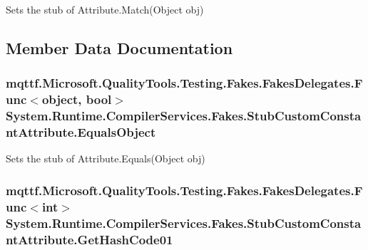 Sets the stub of Attribute.\-Match(\-Object obj)



\subsection{Member Data Documentation}
\hypertarget{class_system_1_1_runtime_1_1_compiler_services_1_1_fakes_1_1_stub_custom_constant_attribute_ad6fe622b0b81d2f93c0c7b753257330c}{
\subsubsection[{Equals\-Object}]{\setlength{\rightskip}{0pt plus 5cm}mqttf.\-Microsoft.\-Quality\-Tools.\-Testing.\-Fakes.\-Fakes\-Delegates.\-Func$<$object, bool$>$ System.\-Runtime.\-Compiler\-Services.\-Fakes.\-Stub\-Custom\-Constant\-Attribute.\-Equals\-Object}}\label{class_system_1_1_runtime_1_1_compiler_services_1_1_fakes_1_1_stub_custom_constant_attribute_ad6fe622b0b81d2f93c0c7b753257330c}


Sets the stub of Attribute.\-Equals(\-Object obj)

\hypertarget{class_system_1_1_runtime_1_1_compiler_services_1_1_fakes_1_1_stub_custom_constant_attribute_a952331c31561b4af1d1609a8a69a75a2}{
\subsubsection[{Get\-Hash\-Code01}]{\setlength{\rightskip}{0pt plus 5cm}mqttf.\-Microsoft.\-Quality\-Tools.\-Testing.\-Fakes.\-Fakes\-Delegates.\-Func$<$int$>$ System.\-Runtime.\-Compiler\-Services.\-Fakes.\-Stub\-Custom\-Constant\-Attribute.\-Get\-Hash\-Code01}}\label{class_system_1_1_runtime_1_1_compiler_services_1_1_fakes_1_1_stub_custom_constant_attribute_a952331c31561b4af1d1609a8a69a75a2}


